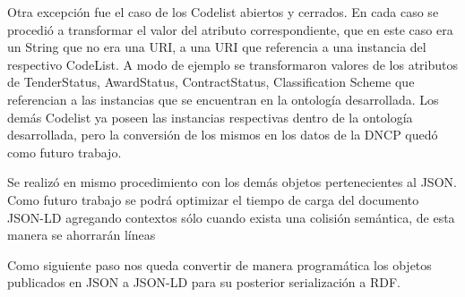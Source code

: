 Otra excepción fue el caso de los Codelist abiertos y cerrados. En cada caso se procedió a transformar el valor del atributo correspondiente, que en este caso era un String que no era una URI, a una URI que referencia a una instancia del respectivo CodeList. A modo de ejemplo se transformaron valores de los atributos de TenderStatus, AwardStatus, ContractStatus, Classification Scheme que referencian a las instancias que se encuentran en la ontología desarrollada. Los demás Codelist ya poseen las instancias respectivas dentro de la ontología desarrollada, pero la conversión de los mismos en los datos de la DNCP quedó como futuro trabajo.

Se realizó en mismo procedimiento con los demás objetos pertenecientes al JSON. Como futuro trabajo se podrá optimizar el tiempo de carga del documento JSON-LD agregando contextos sólo cuando exista una colisión semántica, de esta manera se ahorrarán líneas

Como siguiente paso nos queda convertir de manera programática los objetos publicados en JSON a JSON-LD para su posterior serialización a RDF.

